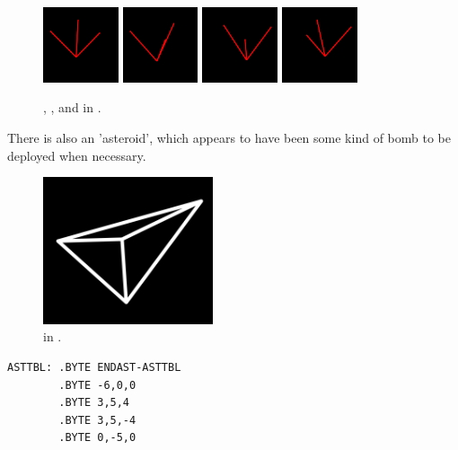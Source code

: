 \begin{figure}[H]
  \centering
        \includegraphics[width=2.22cm]{src/recreation/ESHTBL.png}%
        \hspace{0.2cm}
        \includegraphics[width=2.22cm]{src/recreation/ES2TBL.png}%
        \hspace{0.2cm}
        \includegraphics[width=2.22cm]{src/recreation/ES3TBL.png}%
        \hspace{0.2cm}
        \includegraphics[width=2.22cm]{src/recreation/ES4TBL.png}%
        \hspace{0.2cm}
  \caption*{, ,  and  in .}
\end{figure}
There is also an 'asteroid', which appears to have been some kind of bomb to be deployed when necessary.

\begin{minipage}[c]{0.48\linewidth}
\begin{figure}[H]
    \centering
    \begin{adjustbox}{width=4.5cm,center}
        \includegraphics[width=5cm]{src/recreation/asteroid.png}%
    \end{adjustbox}
  \caption*{ in .}
\end{figure}
\end{minipage}
\begin{minipage}[c]{0.48\linewidth}
\begin{lstlisting}
ASTTBL: .BYTE ENDAST-ASTTBL
        .BYTE -6,0,0
        .BYTE 3,5,4
        .BYTE 3,5,-4
        .BYTE 0,-5,0
\end{lstlisting}
\vspace*{\fill}
\end{minipage}

